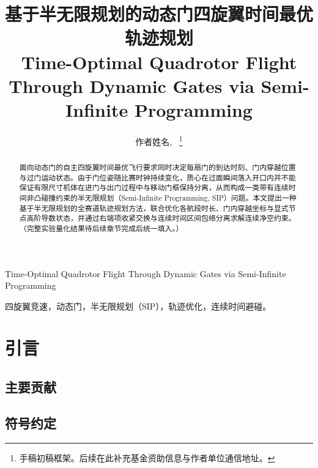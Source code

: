 \documentclass[journal]{IEEEtran}
\begin{document}
\title{基于半无限规划的动态门四旋翼时间最优轨迹规划\\
{\large Time-Optimal Quadrotor Flight Through Dynamic Gates via Semi-Infinite Programming}}

\author{作者姓名,~%
\thanks{手稿初稿框架。后续在此补充基金资助信息与作者单位通信地址。}}

%
{Time-Optimal Quadrotor Flight Through Dynamic Gates via Semi-Infinite Programming}

\maketitle

\begin{abstract}
面向动态门的自主四旋翼时间最优飞行要求同时决定每扇门的到达时刻、门内穿越位置与过门运动状态。由于门位姿随比赛时钟持续变化，质心在过面瞬间落入开口内并不能保证有限尺寸机体在进门与出门过程中与移动门框保持分离，从而构成一类带有连续时间非凸碰撞约束的半无限规划（Semi-Infinite Programming, SIP）问题。本文提出一种基于半无限规划的全赛道轨迹规划方法，联合优化各航段时长、门内穿越坐标与显式节点高阶导数状态，并通过右端项收紧交换与连续时间区间包络分离求解连续净空约束。（完整实验量化结果待后续章节完成后统一填入。）
\end{abstract}

\begin{IEEEkeywords}
四旋翼竞速，动态门，半无限规划（SIP），轨迹优化，连续时间避碰。
\end{IEEEkeywords}

\section{引言}

\subsection{主要贡献}

\subsection{符号约定}
\end{document}
